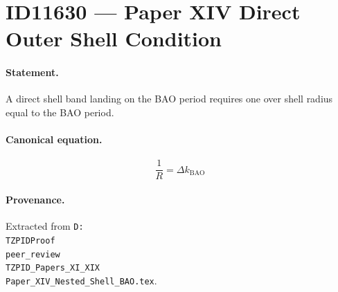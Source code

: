 \section*{ID11630 --- Paper XIV Direct Outer Shell Condition}

\paragraph{Statement.}
A direct shell band landing on the BAO period requires one over shell radius equal to the BAO period.

\paragraph{Canonical equation.}
\[
\frac{1}{R}=\Delta k_{\mathrm{BAO}}
\]

\paragraph{Provenance.}
Extracted from \texttt{D:\\TZPIDProof\\peer\_review\\TZPID\_Papers\_XI\_XIX\\Paper\_XIV\_Nested\_Shell\_BAO.tex}.
